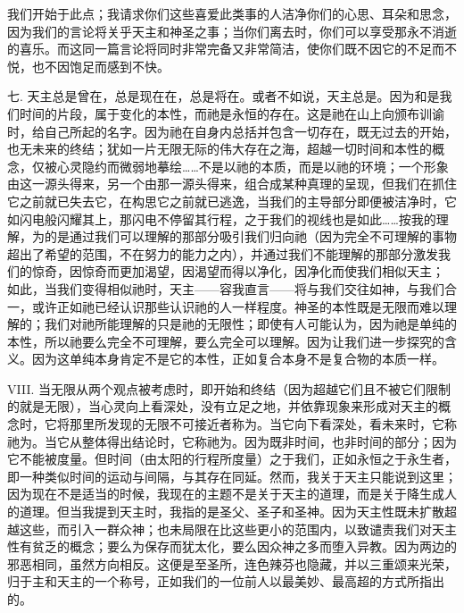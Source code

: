 我们开始于此点；我请求你们这些喜爱此类事的人洁净你们的心思、耳朵和思念，因为我们的言论将关乎天主和神圣之事；当你们离去时，你们可以享受那永不消逝的喜乐。而这同一篇言论将同时非常完备又非常简洁，使你们既不因它的不足而不悦，也不因饱足而感到不快。\par

七. 天主总是曾在，总是现在在，总是将在。或者不如说，天主总是。因为和是我们时间的片段，属于变化的本性，而祂是永恒的存在。这是祂在山上向颁布训谕时，给自己所起的名字。因为祂在自身内总括并包含一切存在，既无过去的开始，也无未来的终结；犹如一片无限无际的伟大存在之海，超越一切时间和本性的概念，仅被心灵隐约而微弱地摹绘……不是以祂的本质，而是以祂的环境；一个形象由这一源头得来，另一个由那一源头得来，组合成某种真理的呈现，但我们在抓住它之前就已失去它，在构思它之前就已逃逸，当我们的主导部分即便被洁净时，它如闪电般闪耀其上，那闪电不停留其行程，之于我们的视线也是如此……按我的理解，为的是通过我们可以理解的那部分吸引我们归向祂（因为完全不可理解的事物超出了希望的范围，不在努力的能力之内），并通过我们不能理解的那部分激发我们的惊奇，因惊奇而更加渴望，因渴望而得以净化，因净化而使我们相似天主； 如此，当我们变得相似祂时，天主——容我直言——将与我们交往如神，与我们合一，或许正如祂已经认识那些认识祂的人一样程度。神圣的本性既是无限而难以理解的；我们对祂所能理解的只是祂的无限性；即使有人可能认为，因为祂是单纯的本性，所以祂要么完全不可理解，要么完全可以理解。因为让我们进一步探究的含义。因为这单纯本身肯定不是它的本性，正如复合本身不是复合物的本质一样。\par

VIII. 当无限从两个观点被考虑时，即开始和终结（因为超越它们且不被它们限制的就是无限），当心灵向上看深处，没有立足之地，并依靠现象来形成对天主的概念时，它将那里所发现的无限不可接近者称为。当它向下看深处，看未来时，它称祂为。当它从整体得出结论时，它称祂为。因为既非时间，也非时间的部分；因为它不能被度量。但时间（由太阳的行程所度量）之于我们，正如永恒之于永生者，即一种类似时间的运动与间隔，与其存在同延。然而，我关于天主只能说到这里；因为现在不是适当的时候，我现在的主题不是关于天主的道理，而是关于降生成人的道理。但当我提到天主时，我指的是圣父、圣子和圣神。因为天主性既未扩散超越这些，而引入一群众神；也未局限在比这些更小的范围内，以致谴责我们对天主性有贫乏的概念；要么为保存而犹太化，要么因众神之多而堕入异教。因为两边的邪恶相同，虽然方向相反。这便是至圣所，连色辣芬也隐藏，并以三重颂来光荣，归于主和天主的一个称号，正如我们的一位前人以最美妙、最高超的方式所指出的。\par

